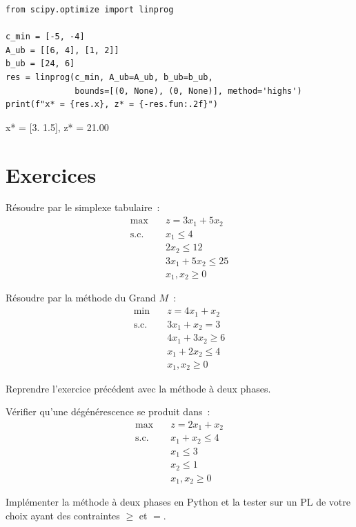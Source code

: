 \begin{codeblock}[title=\textbf{V\'erification avec SciPy}]
\begin{verbatim}
from scipy.optimize import linprog

c_min = [-5, -4]
A_ub = [[6, 4], [1, 2]]
b_ub = [24, 6]
res = linprog(c_min, A_ub=A_ub, b_ub=b_ub,
              bounds=[(0, None), (0, None)], method='highs')
print(f"x* = {res.x}, z* = {-res.fun:.2f}")
\end{verbatim}
\end{codeblock}

\begin{codeoutput}
x* = [3.  1.5], z* = 21.00
\end{codeoutput}

\section{Exercices}

\begin{exercice}
R\'esoudre par le simplexe tabulaire~:
\[
\begin{aligned}
  \max \quad & z = 3x_1 + 5x_2 \\
  \text{s.c.} \quad
    & x_1 \le 4 \\
    & 2x_2 \le 12 \\
    & 3x_1 + 5x_2 \le 25 \\
    & x_1, x_2 \ge 0
\end{aligned}
\]
\end{exercice}

\begin{exercice}
R\'esoudre par la m\'ethode du Grand $M$~:
\[
\begin{aligned}
  \min \quad & z = 4x_1 + x_2 \\
  \text{s.c.} \quad
    & 3x_1 + x_2 = 3 \\
    & 4x_1 + 3x_2 \ge 6 \\
    & x_1 + 2x_2 \le 4 \\
    & x_1, x_2 \ge 0
\end{aligned}
\]
\end{exercice}

\begin{exercice}
Reprendre l'exercice pr\'ec\'edent avec la m\'ethode \`a deux phases.
\end{exercice}

\begin{exercice}
V\'erifier qu'une d\'eg\'en\'erescence se produit dans~:
\[
\begin{aligned}
  \max \quad & z = 2x_1 + x_2 \\
  \text{s.c.} \quad
    & x_1 + x_2 \le 4 \\
    & x_1 \le 3 \\
    & x_2 \le 1 \\
    & x_1, x_2 \ge 0
\end{aligned}
\]
\end{exercice}

\begin{exercice}
Impl\'ementer la m\'ethode \`a deux phases en Python et la tester sur un
PL de votre choix ayant des contraintes $\ge$ et $=$.
\end{exercice}
